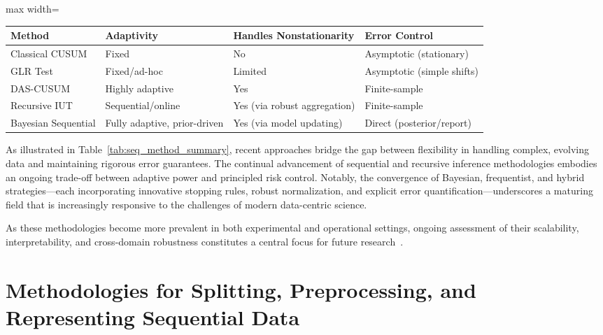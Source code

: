 \begin{table*}[htbp]
\centering
\caption{Summary of Key Sequential Testing Methodologies and Features}
\label{tab:seq_method_summary}
\begin{adjustbox}{max width=\textwidth}
\begin{tabular}{llll}
\toprule
\textbf{Method}            & \textbf{Adaptivity}           & \textbf{Handles Nonstationarity}  & \textbf{Error Control}      \\
\midrule
Classical CUSUM           & Fixed                         & No                                & Asymptotic (stationary)     \\
GLR Test                  & Fixed/ad-hoc                  & Limited                           & Asymptotic (simple shifts)  \\
DAS-CUSUM                 & Highly adaptive               & Yes                               & Finite-sample               \\
Recursive IUT             & Sequential/online             & Yes (via robust aggregation)      & Finite-sample               \\
Bayesian Sequential       & Fully adaptive, prior-driven  & Yes (via model updating)          & Direct (posterior/report)   \\
\bottomrule
\end{tabular}
\end{adjustbox}
\end{table*}

As illustrated in Table~\ref{tab:seq_method_summary}, recent approaches bridge the gap between flexibility in handling complex, evolving data and maintaining rigorous error guarantees. The continual advancement of sequential and recursive inference methodologies embodies an ongoing trade-off between adaptive power and principled risk control. Notably, the convergence of Bayesian, frequentist, and hybrid strategies—each incorporating innovative stopping rules, robust normalization, and explicit error quantification—underscores a maturing field that is increasingly responsive to the challenges of modern data-centric science.

As these methodologies become more prevalent in both experimental and operational settings, ongoing assessment of their scalability, interpretability, and cross-domain robustness constitutes a central focus for future research~\cite{ref8, ref11, ref15, ref17, ref18, ref19, ref26, ref29, ref31, ref66, ref78, ref81, ref86}.

\section{Methodologies for Splitting, Preprocessing, and Representing Sequential Data}

